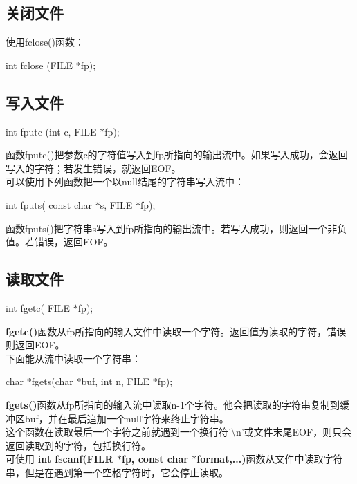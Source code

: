 \documentclass[UTF8]{ctexart}
\begin{document}
			\subsection{关闭文件}
			使用fclose()函数：
			\begin{framed}
				int fclose (FILE $*$fp);
			\end{framed}
			\subsection{写入文件}
			\begin{framed}
				int fputc (int c, FILE $*$fp);
			\end{framed}
			函数fputc()把参数c的字符值写入到fp所指向的输出流中。如果写入成功，会返回写入的字符；若发生错误，就返回EOF。\\
			可以使用下列函数把一个以null结尾的字符串写入流中：\begin{framed}
				int fputs( const char $*$s, FILE $*$fp);
			\end{framed}
			函数fputs()把字符串s写入到fp所指向的输出流中。若写入成功，则返回一个非负值。若错误，返回EOF。
			\subsection{读取文件}
			\begin{framed}
				int fgetc( FILE $*$fp);
			\end{framed}
			\textbf{fgetc()}函数从fp所指向的输入文件中读取一个字符。返回值为读取的字符，错误则返回EOF。\\
			下面能从流中读取一个字符串：\begin{framed}
				char $*$fgets(char $*$buf, int n, FILE $*$fp);
			\end{framed}
			\textbf{fgets()}函数从fp所指向的输入流中读取n-1个字符。他会把读取的字符串复制到缓冲区buf，并在最后追加一个null字符来终止字符串。\\
			这个函数在读取最后一个字符之前就遇到一个换行符'\textbackslash n'或文件末尾EOF，则只会返回读取到的字符，包括换行符。\\
			可使用 \textbf{int fscanf(FILR $*$fp, const char $*$format,...)}函数从文件中读取字符串，但是在遇到第一个空格字符时，它会停止读取。
\end{document}
